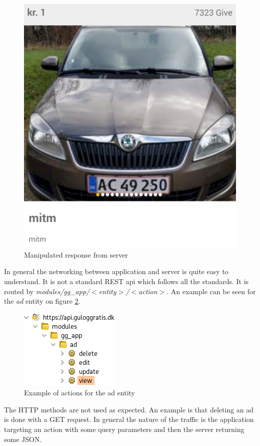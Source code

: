 \begin{figure}[htbp]
    \centering
    \includegraphics[width=0.5\columnwidth]{../dynamic-analysis/pictures/server-client-mitm.png}
    \caption{Manipulated response from server}
    \label{fig:server-client-mitm}
\end{figure}

In general the networking between application and server is quite easy to understand. It is not a standard REST api which follows all the standards. It is routed by \textit{modules/gg\_app/$<$entity$>$/$<$action$>$}. An example can be seen for the \textit{ad} entity on figure \ref{fig:ad-actions}. 

\begin{figure}[htbp]
    \centering
    \includegraphics[width=0.5\columnwidth]{../dynamic-analysis/pictures/ad-actions.png}
    \caption{Example of actions for the ad entity}
    \label{fig:ad-actions}
\end{figure}

The HTTP methods are not used as expected. An example is that deleting an ad is done with a GET request. In general the nature of the traffic is the application targeting an action with some query parameters and then the server returning some JSON.    